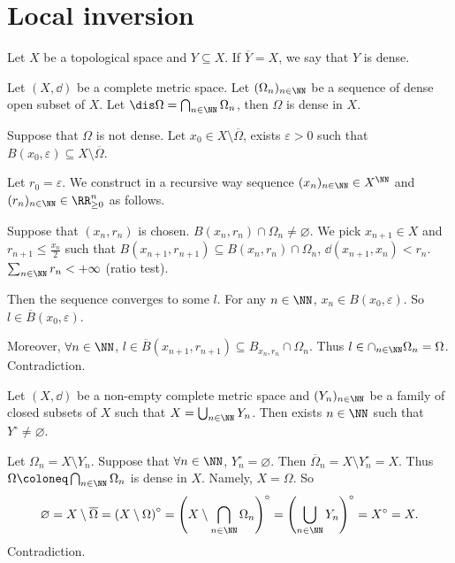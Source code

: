 \section{Local inversion}
\begin{definitionenv}
     Let $X$ be a topological space and $Y\subseteq X$. If $\overline{Y}=X$, we say that $Y$ is dense.
\end{definitionenv}
\begin{theoremenv}[Baire]
    Let $(X,\dd)$ be a complete metric space. Let $(\Omega_n)_{n\in \NN}$ be a sequence of dense open subset of $X$.
    Let $\dis \Omega=\bigcap_{n\in\NN}\Omega_n$, then $\Omega$ is dense in $X$.
\end{theoremenv}
\begin{proofenv}
    Suppose that $\Omega$ is not dense. Let $x_0\in X\setminus \overline{\Omega}$, exists $\varepsilon>0$ such that $B(x_0,\varepsilon)\subseteq X\setminus \overline{\Omega}$.

    Let $r_0=\varepsilon$. We construct in a recursive way sequence $(x_n)_{n\in \NN}\in X^\NN$ and $(r_n)_{n\in \NN}\in \RR_{\ge 0}^n$ as follows.

    \quad Suppose that $(x_n,r_n)$ is chosen. $B(x_n,r_n)\cap \Omega_{n}\neq \varnothing$. We pick $x_{n+1}\in X$ and $r_{n+1}\le \frac{x_n}{2}$ such that $B(x_{n+1},r_{n+1})\subseteq B(x_n,r_n)\cap \Omega_n$, $\dd(x_{n+1},x_n)<r_n$. $\sum_{n\in \NN}r_n<+\infty$ (ratio test).

    \quad Then the sequence converges to some $l$. For any $n\in\NN$, $x_n\in B(x_0,\varepsilon)$. So $l\in \overline{B}(x_0,\varepsilon)$.

    \quad Moreover, $\forall n\in \NN$, $l\in \overline{B}(x_{n+1},r_{n+1})\subseteq B_{x_n,r_n}\cap \Omega_{n}$. Thus $l\in \cap_{n\in \NN}\Omega_{n}=\Omega$. Contradiction.
\end{proofenv}
\begin{corollaryenv}
    Let $(X,\dd)$ be a non-empty complete metric space and $(Y_n)_{n\in \NN}$ be a family of closed subsets of $X$ such that $X=\bigcup_{n\in \NN}Y_n$. Then exists $n\in \NN$ such that $Y^\circ\neq\varnothing$.
\end{corollaryenv}
\begin{proofenv}
    Let $\Omega_n=X\setminus Y_n$. Suppose that $\forall n\in \NN$, $Y_n^\circ=\varnothing$.
    Then $\overline{\Omega}_n=X\setminus Y_n^\circ=X$. Thus $\Omega\coloneq \bigcap_{n\in \NN}\Omega_n$ is dense in $X$. Namely, $X=\Omega$. So
    $$\varnothing=X\setminus \overline{\Omega}=\left(X\setminus \Omega\right)^\circ=\left(X\setminus \bigcap_{n\in \NN}\Omega_n\right)^\circ=\left(\bigcup_{n\in \NN}Y_n\right)^\circ=X^\circ=X.$$
    Contradiction.
\end{proofenv}

